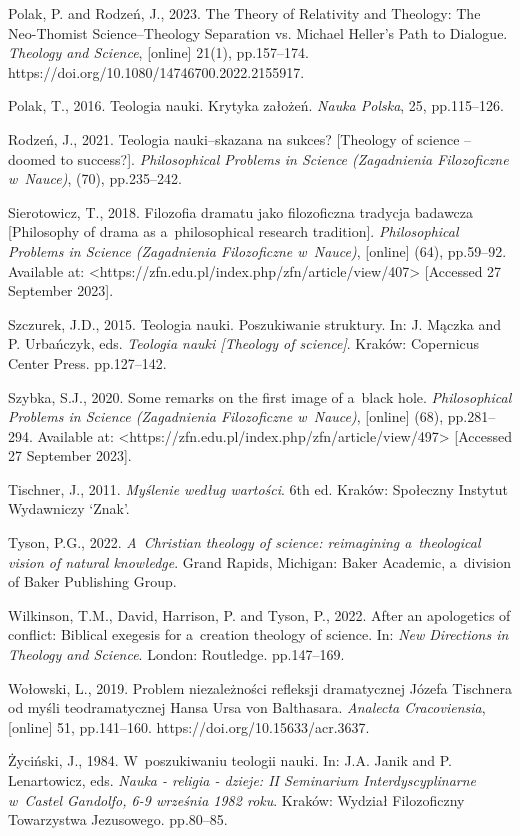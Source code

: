 Polak, P. and Rodzeń, J., 2023. The Theory of Relativity and Theology: The Neo-Thomist Science–Theology Separation vs. Michael Heller's Path to Dialogue. \textit{Theology and Science}, [online] 21(1), pp.157–174. https://doi.org/10.1080/14746700.2022.2155917.



Polak, T., 2016. Teologia nauki. Krytyka założeń. \textit{Nauka Polska}, 25, pp.115–126.



Rodzeń, J., 2021. Teologia nauki–skazana na sukces? [Theology of science -- doomed to success?]. \textit{Philosophical Problems in Science (Zagadnienia Filozoficzne w~Nauce)}, (70), pp.235–242.



Sierotowicz, T., 2018. Filozofia dramatu jako filozoficzna tradycja badawcza [Philosophy of drama as a~philosophical research tradition]. \textit{Philosophical Problems in Science (Zagadnienia Filozoficzne w~Nauce)}, [online] (64), pp.59–92. Available at: {\textless}https://zfn.edu.pl/index.php/zfn/article/view/407{\textgreater} [Accessed 27 September 2023].



Szczurek, J.D., 2015. Teologia nauki. Poszukiwanie struktury. In: J. Mączka and P. Urbańczyk, eds. \textit{Teologia nauki [Theology of science]}. Kraków: Copernicus Center Press. pp.127–142.



Szybka, S.J., 2020. Some remarks on the first image of a~black hole. \textit{Philosophical Problems in Science (Zagadnienia Filozoficzne w~Nauce)}, [online] (68), pp.281–294. Available at: {\textless}https://zfn.edu.pl/index.php/zfn/article/view/497{\textgreater} [Accessed 27 September 2023].



Tischner, J., 2011. \textit{Myślenie według wartości}. 6th ed. Kraków: Społeczny Instytut Wydawniczy ‘Znak'.



Tyson, P.G., 2022. \textit{A~Christian theology of science: reimagining a~theological vision of natural knowledge}. Grand Rapids, Michigan: Baker Academic, a~division of Baker Publishing Group.



Wilkinson, T.M., David, Harrison, P. and Tyson, P., 2022. After an apologetics of conflict: Biblical exegesis for a~creation theology of science. In: \textit{New Directions in Theology and Science}. London: Routledge. pp.147–169.



Wołowski, L., 2019. Problem niezależności refleksji dramatycznej Józefa Tischnera od myśli teodramatycznej Hansa Ursa von Balthasara. \textit{Analecta Cracoviensia}, [online] 51, pp.141–160. https://doi.org/10.15633/acr.3637.



Życiński, J., 1984. W~poszukiwaniu teologii nauki. In: J.A. Janik and P. Lenartowicz, eds. \textit{Nauka - religia - dzieje: II Seminarium Interdyscyplinarne w~Castel Gandolfo, 6-9 września 1982 roku}. Kraków: Wydział Filozoficzny Towarzystwa Jezusowego. pp.80–85.



